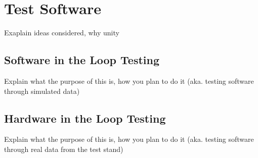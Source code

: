 \section{Test Software}

Exaplain ideas considered, why unity

\subsection{Software in the Loop Testing}

Explain what the purpose of this is, how you plan to do it (aka. testing software through simulated data)

\subsection{Hardware in the Loop Testing}

Explain what the purpose of this is, how you plan to do it (aka. testing software through real data from the test stand)